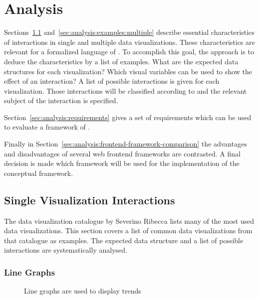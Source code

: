 \chapter{Analysis}\label{sec:analysis}
Sections~\ref{sec:analysis:examples:single} and~\ref{sec:analysis:examples:multiple} describe essential characteristics of interactions in single and multiple data visualizations.
These characteristics are relevant for a formalized language of \cmvs{}.
To accomplish this goal, the approach is to deduce the characteristics by a list of examples.
What are the expected data structures for each visualization?
Which visual variables can be used to show the effect of an interaction?
A list of possible interactions is given for each visualization.
Those interactions will be classified according to \textcite{Yi2007} and the relevant subject of the interaction is specified.

Section~\ref{sec:analysis:requirements} gives a set of requirements which can be used to evaluate a framework of \cmvs{}.

Finally in Section~\ref{sec:analysis:frontend-framework-comparison} the advantages and disadvantages of several web frontend frameworks are contrasted.
A final decision is made which framework will be used for the implementation of the conceptual framework.

\section{Single Visualization Interactions}\label{sec:analysis:examples:single}

The data visualization catalogue by Severino Ribecca lists many of the most used data visualizations\cite{VisualizationCatalogue2017}.
This section covers a list of common data visualizations from that catalogue as examples.
The expected data structure and a list of possible interactions are systematically analysed.

\subsection{Line Graphs}
\begin{figure}
  \begin{center}
    \qquad
  \end{center}
  \caption{Line graphs are used to display trends}
  \label{fig:analysis:line-graphs}
\end{figure}

